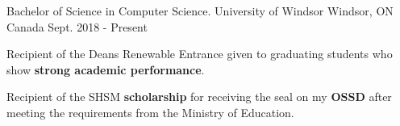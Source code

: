 

\begin{cventries}

  \cventry
    {Bachelor of Science in Computer Science.} %
    {University of Windsor} %
    {Windsor, ON Canada} %
    {Sept. 2018 - Present} %
    {
      \begin{cvitems} %
        \item {Recipient of the Deans Renewable Entrance \textbf{\href{https://www.uwindsor.ca/studentawards/sites/uwindsor.ca.studentawards/files/2020-2021_entrance_award_regulations.pdf}{}} given to graduating students who show \textbf{strong academic performance}.}
        \item {Recipient of the SHSM \textbf{scholarship} for receiving the  \textbf{\href{http://www.edu.gov.on.ca/morestudentsuccess/sector/information.html}{}} seal on my \textbf{OSSD} after meeting the requirements from the Ministry of Education.}
      \end{cvitems}
    }
\end{cventries}
